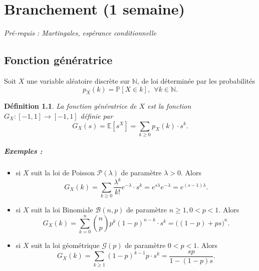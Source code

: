 \documentclass[a4paper,12pt]{book}
\newtheorem{defnfr}[thmfr]{Définition}
\begin{document}
\chapter{Branchement (1 semaine)}

\textit{Pré-requis : Martingales, espérance conditionnelle}
\section{Fonction génératrice}
Soit $X$ une variable aléatoire discrète sur $\mathbb{N}$, de loi déterminée par les probabilités
$$p_X(k)=\mathbb{P}[X\in k], \ \ \forall k\in \mathbb{N}.$$
\begin{defnfr}La \emph{fonction génératrice} de $X$ est la fonction $G_X: [-1,1]\to [-1,1]$ définie par
$$G_X(s)=\mathbb{E}[s^X]=\sum_{k\geq 0} p_X(k)\cdot s^k .$$
\end{defnfr}
\paragraph{Exemples :}
\begin{itemize}
\item si $X$ suit la loi de Poisson $\mathcal{P}(\lambda)$ de paramètre $\lambda>0$. Alors
$$G_X(k)=\sum_{k\geq 0} \frac{\lambda^k}{k!}e^{-\lambda}\cdot s^k =e^{s\lambda}e^{-\lambda}=e^{(s-1)\lambda}.$$
\item si $X$ suit la loi Binomiale $\mathcal{B}(n,p)$ de paramètre $n\geq 1, 0<p<1$. Alors
$$G_X(k)=\sum_{k= 0}^n {n \choose p} p^k(1-p)^{n-k}\cdot s^k =\Big((1-p)+ps\Big)^n.$$
\item si $X$ suit la loi géométrique $\mathcal{G}(p)$ de paramètre $0<p<1$. Alors
$$G_X(k)=\sum_{k\geq 1} (1-p)^{k-1}p\cdot s^k =\frac{sp}{1-(1-p)s}.$$
\end{itemize}
\end{document}
